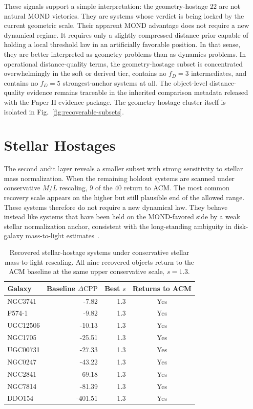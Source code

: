 ﻿\documentclass[aps,prd,twocolumn,superscriptaddress,longbibliography,nofootinbib,floatfix,10pt]{revtex4-2}
\begin{document}
These signals support a simple interpretation: the geometry-hostage 22 are not
natural MOND victories. They are systems whose verdict is being locked by the
current geometric scale. Their apparent MOND advantage does not require a new
dynamical regime. It requires only a slightly compressed distance prior capable
of holding a local threshold law in an artificially favorable position. In that
sense, they are better interpreted as geometry problems than as dynamics
problems. In operational distance-quality terms, the geometry-hostage subset is
concentrated overwhelmingly in the soft or derived tier, contains no
$f_D = 3$ intermediates, and contains no $f_D = 5$ strongest-anchor systems at
all. The object-level distance-quality evidence remains traceable in the
inherited comparison metadata released with the Paper II evidence package. The
geometry-hostage cluster itself is isolated in
Fig.~\ref{fig:recoverable-subsets}.

\section{Stellar Hostages}

The second audit layer reveals a smaller subset with strong sensitivity to
stellar mass normalization. When the remaining holdout systems are scanned
under conservative $M/L$ rescaling, 9 of the 40 return to ACM. The most common
recovery scale appears on the higher but still plausible end of the allowed
range. These systems therefore do not require a new dynamical law. They behave
instead like systems that have been held on the MOND-favored side by a weak
stellar normalization anchor, consistent with the long-standing ambiguity in
disk-galaxy mass-to-light estimates~\cite{BellDeJong2001,LelliMcGaughSchombert2016SPARC}.

\begin{table}[t]
\centering
\small
\caption{
Recovered stellar-hostage systems under conservative stellar
mass-to-light rescaling. All nine recovered objects return to the ACM baseline
at the same upper conservative scale, $s = 1.3$.
}
\label{tab:stellar-recovery}
\begin{tabular}{lrrc}
\toprule
Galaxy & Baseline $\Delta\mathrm{CPP}$ & Best $s$ & Returns to ACM \\
\midrule
NGC3741  & -7.82   & 1.3 & Yes \\
F574-1   & -9.82   & 1.3 & Yes \\
UGC12506 & -10.13  & 1.3 & Yes \\
NGC1705  & -25.51  & 1.3 & Yes \\
UGC00731 & -27.33  & 1.3 & Yes \\
NGC0247  & -43.22  & 1.3 & Yes \\
NGC2841  & -69.18  & 1.3 & Yes \\
NGC7814  & -81.39  & 1.3 & Yes \\
DDO154   & -401.51 & 1.3 & Yes \\
\bottomrule
\end{tabular}
\end{table}
\end{document}

